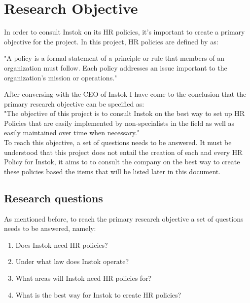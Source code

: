 \documentclass[man]{apa6}
\begin{document}
\section{Research Objective}
In order to consult Instok on its HR policies, it's important to create a primary objective for the project. In this project, HR policies are defined by \cite{HRCA2016} as: 

\begin{displayquote}
"A policy is a formal statement of a principle or rule that members of an organization must follow. Each policy addresses an issue important to the organization's mission or operations."
\end{displayquote}

After conversing with the CEO of Instok I have come to the conclusion that the primary research objective can be specified as:\\
"The objective of this project is to consult Instok on the best way to set up HR Policies that are easily implemented by non-specialists in the field as well as easily maintained over time when necessary."\\
To reach this objective, a set of questions needs to be answered. It must be understood that this project does not entail the creation of each and every HR Policy for Instok, it aims to to consult the company on the best way to create these policies based the items that will be listed later in this document. 

\subsection{Research questions}
As mentioned before, to reach the primary research objective a set of questions needs to be answered, namely:
\begin{enumerate}
\item Does Instok need HR policies?
\item Under what law does Instok operate?
\item What areas will Instok need HR policies for?
\item What is the best way for Instok to create HR policies?
\end{enumerate}
\end{document}
